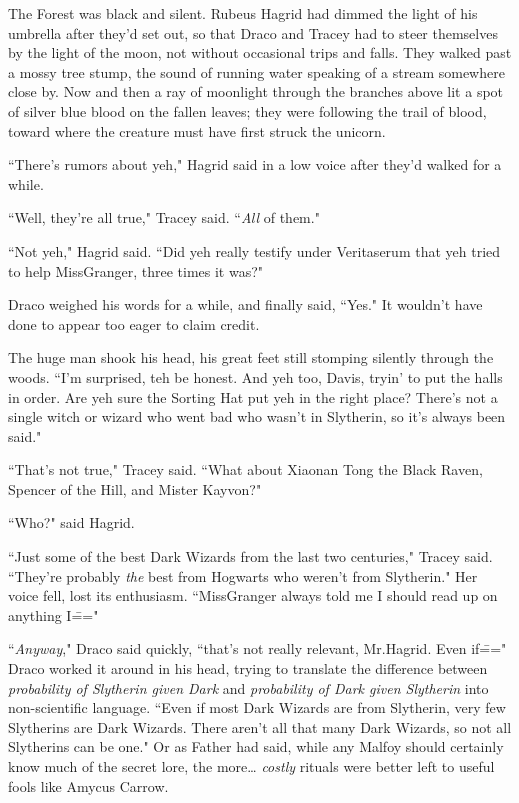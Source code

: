 The Forest was black and silent. Rubeus Hagrid had dimmed the light of his umbrella after they'd set out, so that Draco and Tracey had to steer themselves by the light of the moon, not without occasional trips and falls. They walked past a mossy tree stump, the sound of running water speaking of a stream somewhere close by. Now and then a ray of moonlight through the branches above lit a spot of silver blue blood on the fallen leaves; they were following the trail of blood, toward where the creature must have first struck the unicorn.

``There's rumors about yeh," Hagrid said in a low voice after they'd walked for a while.

``Well, they're all true," Tracey said. ``\emph{All} of them."

``Not yeh," Hagrid said. ``Did yeh really testify under Veritaserum that yeh tried to help Miss\?Granger, three times it was?"

Draco weighed his words for a while, and finally said, ``Yes." It wouldn't have done to appear too eager to claim credit.

The huge man shook his head, his great feet still stomping silently through the woods. ``I'm surprised, teh be honest. And yeh too, Davis, tryin' to put the halls in order. Are yeh sure the Sorting Hat put yeh in the right place? There's not a single witch or wizard who went bad who wasn't in Slytherin, so it's always been said."

``That's not true," Tracey said. ``What about Xiaonan Tong the Black Raven, Spencer of the Hill, and Mister Kayvon?"

``Who?" said Hagrid.

``Just some of the best Dark Wizards from the last two centuries," Tracey said. ``They're probably \emph{the} best from Hogwarts who weren't from Slytherin." Her voice fell, lost its enthusiasm. ``Miss\?Granger always told me I should read up on anything I\==="

``\emph{Anyway}," Draco said quickly, ``that's not really relevant, Mr.\?Hagrid. Even if\===" Draco worked it around in his head, trying to translate the difference between \emph{probability of Slytherin given Dark} and \emph{probability of Dark given Slytherin} into non-scientific language. ``Even if most Dark Wizards are from Slytherin, very few Slytherins are Dark Wizards. There aren't all that many Dark Wizards, so not all Slytherins can be one." Or as Father had said, while any Malfoy should certainly know much of the secret lore, the more{\ldots} \emph{costly} rituals were better left to useful fools like Amycus Carrow.

